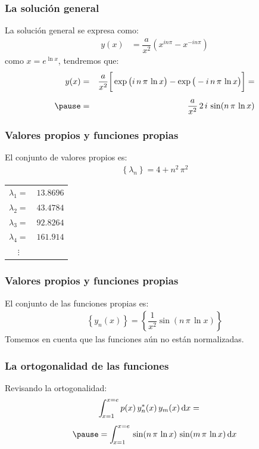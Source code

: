 \documentclass[12pt]{beamer}
\begin{document}
\begin{frame}
\frametitle{La solución general}
La solución general se expresa como:
\begin{align*}
y(x) &= \dfrac{a}{x^{2}} \left( x^{i n \pi} - x^{-i n \pi} \right)
\end{align*}
\pause
como $x = e^{\ln x}$, tendremos que:
\pause
\begin{eqnarray*}
y(x) &=& \dfrac{a}{x^{2}} \bigg[ \exp \big( i \, n \, \pi \, \ln x \big) -  \exp \big( - i \, n \, \pi \, \ln x \big) \bigg] = \\[0.5em] \pause
&=& \dfrac{a}{x^{2}} \, 2 \, i \, \sin (n \, \pi \, \ln x)
\end{eqnarray*}
\end{frame}
\begin{frame}
\frametitle{Valores propios y funciones propias}
El conjunto de valores propios es:
\pause
\begin{align*}
\left\{ \lambda_{n} \right\} = 4 + n^{2} \, \pi^{2}
\end{align*}
\def\arraystretch{1}
\begin{tabular}{c c}
$\lambda_{1} =$ & $13.8696$ \\
$\lambda_{2} =$ & $43.4784$ \\
$\lambda_{3} =$ & $92.8264$ \\
$\lambda_{4} =$ & $161.914$ \\
$\vdots$
\end{tabular}
\end{frame}
\begin{frame}
\frametitle{Valores propios y funciones propias}
El conjunto de las funciones propias es:
\pause
\begin{align*}
\left\{ y_{n} (x) \right\} = \left\{ \dfrac{1}{x^{2}} \sin (n \, \pi \, \ln x) \right\}
\end{align*}
Tomemos en cuenta que las funciones aún no están normalizadas.
\end{frame}
\begin{frame}
\frametitle{La ortogonalidad de las funciones}
Revisando la ortogonalidad:
\pause
\begin{eqnarray*}
\begin{aligned}
&\scaleint{5ex}_{\bs x=1}^{x=e} \, p(x) \, y_{n}^{*} (x) \, y_{m}(x) \dd{x} = \\[0.5em] \pause
&= \scaleint{5ex}_{\bs x=1}^{x=e} \, \sin (n \, \pi  \, \ln x) \, \sin (m \, \pi  \, \ln x) \dd{x}
\end{aligned}
\end{eqnarray*}
\pause
\end{frame}
\end{document}
